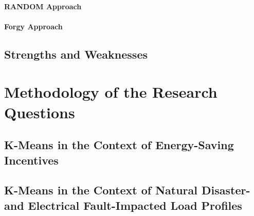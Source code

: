 \paragraph{RANDOM Approach}
\paragraph{Forgy Approach}
\subsection{Strengths and Weaknesses}


\section{Methodology of the Research Questions}
\subsection{K-Means in the Context of Energy-Saving Incentives}

\subsection{K-Means in the Context of Natural Disaster- and Electrical Fault-Impacted Load Profiles}
